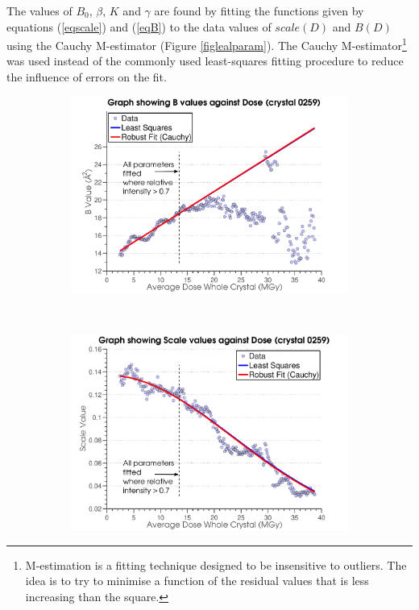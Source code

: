 The values of $B_0$, $\beta$, $K$ and $\gamma$ are found by fitting the functions given by equations (\ref{eqscale}) and (\ref{eqB}) to the data values of $scale(D)$ and $B(D)$ using the Cauchy M-estimator (Figure \ref{figlealparam}).
The Cauchy M-estimator\footnote{M-estimation is a fitting technique designed to be insensitive to outliers. The idea is to try to minimise a function of the residual values that is less increasing than the square.} was used instead of the commonly used least-squares fitting procedure to reduce the influence of errors on the fit.
\begin{figure}
        \centering
        \begin{subfigure}[b]{0.825\textwidth}
                \centering
                \includegraphics[width=\textwidth]{figures/dwd/bplot.pdf}
                \caption{}
                \label{figbvalues}
        \end{subfigure}
				\\
        \begin{subfigure}[b]{0.825\textwidth}
                \centering
                \includegraphics[width=\textwidth]{figures/dwd/scaleplot.pdf}

\end{subfigure}
\end{figure}
